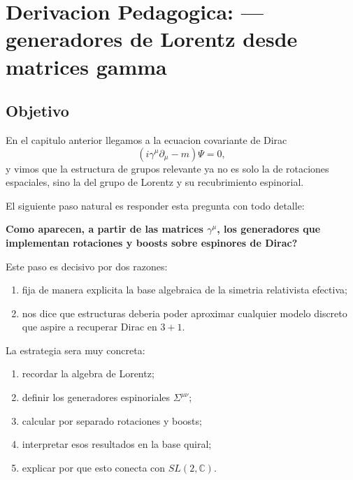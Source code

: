 \chapter{Derivacion Pedagogica: --- generadores de Lorentz desde matrices gamma}
\label{ch:generadores-lorentz}







\section{Objetivo}
En el capitulo anterior llegamos a la ecuacion covariante de Dirac
\begin{equation}
(i\gamma^\mu \partial_\mu - m)\Psi = 0,
\label{c16:eq:dirac}
\end{equation}
y vimos que la estructura de grupos relevante ya no es solo la de rotaciones espaciales, sino la del grupo de Lorentz y su recubrimiento espinorial.

El siguiente paso natural es responder esta pregunta con todo detalle:
\begin{displayquote}
\textbf{Como aparecen, a partir de las matrices $\gamma^\mu$, los generadores que implementan rotaciones y boosts sobre espinores de Dirac?}
\end{displayquote}

Este paso es decisivo por dos razones:
\begin{enumerate}[label=\arabic*.]
    \item fija de manera explicita la base algebraica de la simetria relativista efectiva;
    \item nos dice que estructuras deberia poder aproximar cualquier modelo discreto que aspire a recuperar Dirac en \(3+1\).
\end{enumerate}

La estrategia sera muy concreta:
\begin{enumerate}[label=\arabic*.]
    \item recordar la algebra de Lorentz;
    \item definir los generadores espinoriales $\Sigma^{\mu\nu}$;
    \item calcular por separado rotaciones y boosts;
    \item interpretar esos resultados en la base quiral;
    \item explicar por que esto conecta con \(SL(2,\mathbb{C})\).
\end{enumerate}

